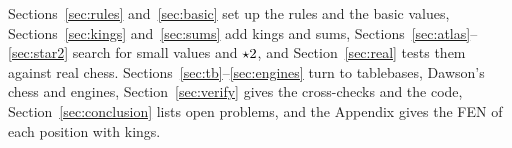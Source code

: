 Sections~\ref{sec:rules} and~\ref{sec:basic} set up the rules and the basic values,
Sections~\ref{sec:kings} and~\ref{sec:sums} add kings and sums, Sections~\ref{sec:atlas}--\ref{sec:star2}
search for small values and $\mathord{\star2}$, and Section~\ref{sec:real} tests them against real chess.
Sections~\ref{sec:tb}--\ref{sec:engines} turn to tablebases, Dawson's chess and engines,
Section~\ref{sec:verify} gives the cross-checks and the code, Section~\ref{sec:conclusion} lists open
problems, and the Appendix gives the FEN of each position with kings.
